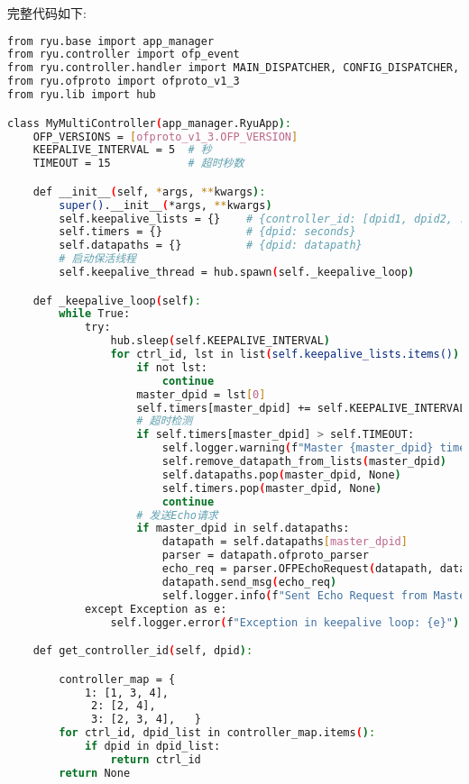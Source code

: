 \documentclass{article}
\begin{document}
\noindent 完整代码如下:
\begin{lstlisting}[language=bash, caption={多控制器保活检测机制代码}]
from ryu.base import app_manager
from ryu.controller import ofp_event
from ryu.controller.handler import MAIN_DISPATCHER, CONFIG_DISPATCHER, DEAD_DISPATCHER, set_ev_cls
from ryu.ofproto import ofproto_v1_3
from ryu.lib import hub

class MyMultiController(app_manager.RyuApp):
    OFP_VERSIONS = [ofproto_v1_3.OFP_VERSION]
    KEEPALIVE_INTERVAL = 5  # 秒
    TIMEOUT = 15            # 超时秒数

    def __init__(self, *args, **kwargs):
        super().__init__(*args, **kwargs)
        self.keepalive_lists = {}    # {controller_id: [dpid1, dpid2, ...]}
        self.timers = {}             # {dpid: seconds}
        self.datapaths = {}          # {dpid: datapath}
        # 启动保活线程
        self.keepalive_thread = hub.spawn(self._keepalive_loop)

    def _keepalive_loop(self):
        while True:
            try:
                hub.sleep(self.KEEPALIVE_INTERVAL)
                for ctrl_id, lst in list(self.keepalive_lists.items()):
                    if not lst:
                        continue
                    master_dpid = lst[0]
                    self.timers[master_dpid] += self.KEEPALIVE_INTERVAL
                    # 超时检测
                    if self.timers[master_dpid] > self.TIMEOUT:
                        self.logger.warning(f"Master {master_dpid} timed out for Controller {ctrl_id}, removing")
                        self.remove_datapath_from_lists(master_dpid)
                        self.datapaths.pop(master_dpid, None)
                        self.timers.pop(master_dpid, None)
                        continue
                    # 发送Echo请求
                    if master_dpid in self.datapaths:
                        datapath = self.datapaths[master_dpid]
                        parser = datapath.ofproto_parser
                        echo_req = parser.OFPEchoRequest(datapath, data=b'keepalive')
                        datapath.send_msg(echo_req)
                        self.logger.info(f"Sent Echo Request from Master {master_dpid} for Controller {ctrl_id}")
            except Exception as e:
                self.logger.error(f"Exception in keepalive loop: {e}")

    def get_controller_id(self, dpid):

        controller_map = {
            1: [1, 3, 4],          
             2: [2, 4],          
             3: [2, 3, 4],   }
        for ctrl_id, dpid_list in controller_map.items():
            if dpid in dpid_list:
                return ctrl_id
        return None


\end{lstlisting}
\end{document}
